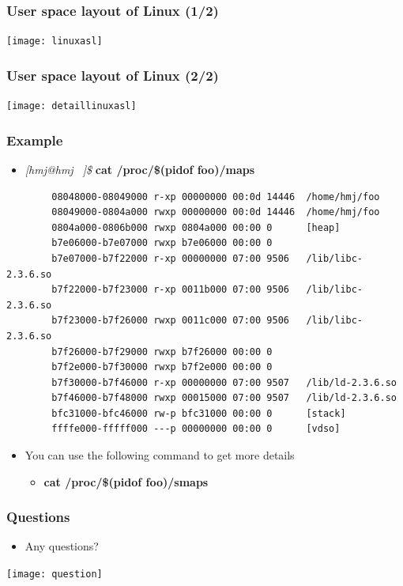 \documentclass[CJKutf8,xcolor=pdftex,dvipsnames,table]{beamer}
\begin{document}
\begin{CJK*}{UTF8}{song}
  \begin{frame}
    \frametitle{User space layout of Linux (1/2)} \pause
    \begin{center}
      \texttt{[image: linuxasl]}
    \end{center}
  \end{frame}

  \begin{frame}
    \frametitle{User space layout of Linux (2/2)} \pause
    \begin{center}
      \texttt{[image: detaillinuxasl]}
    \end{center}
  \end{frame}  
  
  \begin{frame}[fragile]
    \frametitle{Example} \pause
    \begin{itemize}
    \item{\emph{[hmj@hmj ~]\$ }\textbf{cat /proc/\$(pidof foo)/maps}} \pause
    \end{itemize}
    {\tiny
\begin{verbatim}
        08048000-08049000 r-xp 00000000 00:0d 14446  /home/hmj/foo
        08049000-0804a000 rwxp 00000000 00:0d 14446  /home/hmj/foo
        0804a000-0806b000 rwxp 0804a000 00:00 0      [heap]
        b7e06000-b7e07000 rwxp b7e06000 00:00 0
        b7e07000-b7f22000 r-xp 00000000 07:00 9506   /lib/libc-2.3.6.so
        b7f22000-b7f23000 r-xp 0011b000 07:00 9506   /lib/libc-2.3.6.so
        b7f23000-b7f26000 rwxp 0011c000 07:00 9506   /lib/libc-2.3.6.so
        b7f26000-b7f29000 rwxp b7f26000 00:00 0
        b7f2e000-b7f30000 rwxp b7f2e000 00:00 0
        b7f30000-b7f46000 r-xp 00000000 07:00 9507   /lib/ld-2.3.6.so
        b7f46000-b7f48000 rwxp 00015000 07:00 9507   /lib/ld-2.3.6.so
        bfc31000-bfc46000 rw-p bfc31000 00:00 0      [stack]
        ffffe000-fffff000 ---p 00000000 00:00 0      [vdso]
\end{verbatim}
    } \pause
    \begin{itemize}
    \item{You can use the following command to get more details} \pause
      \begin{itemize}
      \item{\textbf{cat /proc/\$(pidof foo)/smaps}}
      \end{itemize}
    \end{itemize}
\end{frame}
  
  \begin{frame}
    \frametitle{Questions}
    \begin{itemize}
    \item{Any questions?}
    \end{itemize}
    \begin{center}
      \texttt{[image: question]}
    \end{center}
  \end{frame}
  

\end{CJK*}
\end{document}
